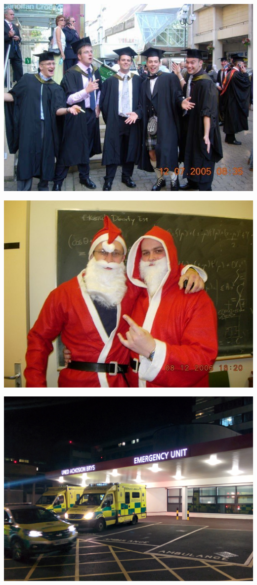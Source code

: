 \documentclass{beamer}
\begin{document}
\begin{frame}
    \begin{center}
        \includegraphics[width=.8\textwidth]{assets/graduation.jpg}
    \end{center}
\end{frame}

\begin{frame}
    \begin{center}
        \includegraphics[width=.8\textwidth]{assets/phd.jpg}
    \end{center}
\end{frame}

\begin{frame}
    \begin{center}
        \includegraphics[width=.8\textwidth]{assets/postdoc.jpg}
    \end{center}
\end{frame}
\end{document}
